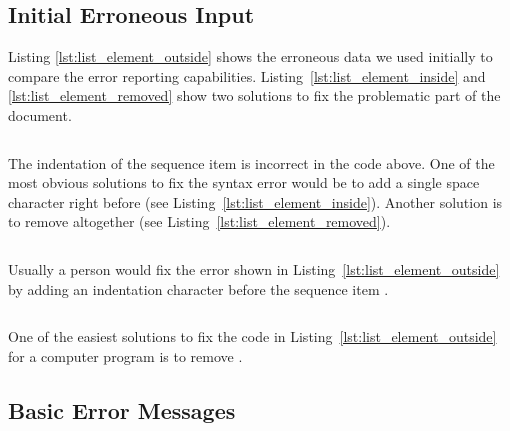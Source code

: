 \subsection{Initial Erroneous Input}

Listing \ref{lst:list_element_outside} shows the erroneous  data we used initially to compare the error reporting capabilities. Listing~\ref{lst:list_element_inside} and \ref{lst:list_element_removed} show two solutions to fix the problematic part of the  document.

\begin{listing}
  \begin{code-boxed}
    \inputminted[linenos]{yaml}{Data/Errors/list_element_outside.yaml}
  \end{code-boxed}
  \caption{The indentation of the sequence item  is incorrect in the code above. One of the most obvious solutions to fix the syntax error would be to add a single space character right before  (see Listing~\ref{lst:list_element_inside}). Another solution is to remove  altogether (see Listing~\ref{lst:list_element_removed}).}
  \label{lst:list_element_outside}
\end{listing}

\begin{listing}
  \begin{code-boxed}
    \inputminted[linenos]{yaml}{Data/Correct/list_element_inside.yaml}
  \end{code-boxed}
  \caption{Usually a person would fix the error shown in Listing~\ref{lst:list_element_outside} by adding an indentation character before the sequence item .}
  \label{lst:list_element_inside}
\end{listing}

\begin{listing}
  \begin{code-boxed}
    \inputminted[linenos]{yaml}{Data/Correct/list_element_removed.yaml}
  \end{code-boxed}
  \caption{One of the easiest solutions to fix the code in Listing~\ref{lst:list_element_outside} for a computer program is to remove .}
  \label{lst:list_element_removed}
\end{listing}

\subsection{Basic Error Messages}

